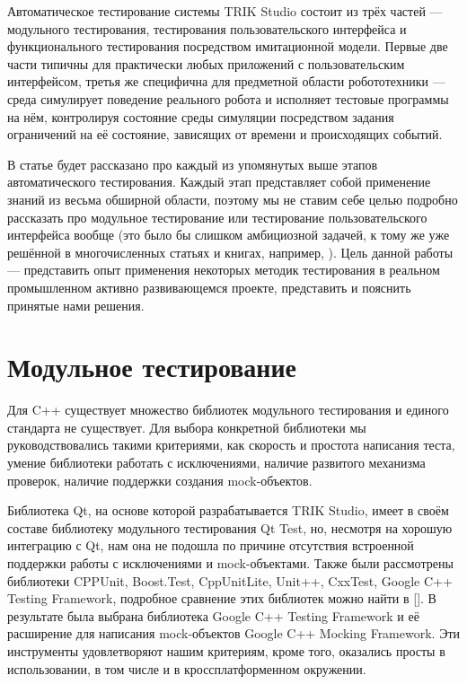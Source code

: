 \documentclass[conference]{IEEEtran}
\begin{document}
Автоматическое тестирование системы TRIK Studio состоит из трёх частей --- модульного тестирования, тестирования 
пользовательского интерфейса и функционального тестирования посредством имитационной модели. Первые две части 
типичны для практически любых приложений с пользовательским интерфейсом, третья же специфична для предметной 
области робототехники --- среда симулирует поведение реального робота и исполняет тестовые программы на нём, 
контролируя состояние среды симуляции посредством задания ограничений на её состояние, зависящих от времени и происходящих событий.

В статье будет рассказано про каждый из упомянутых выше этапов автоматического тестирования. Каждый этап 
представляет собой применение знаний из весьма обширной области, поэтому мы не ставим себе целью подробно 
рассказать про модульное тестирование или тестирование пользовательского интерфейса вообще (это было бы слишком 
амбициозной задачей, к тому же уже решённой в многочисленных статьях и книгах, например, \cite{banerjee2013graphical, kotlyarov2006testing}). 
Цель данной работы --- представить опыт применения некоторых методик тестирования в реальном промышленном 
активно развивающемся проекте, представить и пояснить принятые нами решения.

\section{Модульное тестирование}
Для C++ существует множество библиотек модульного тестирования и единого стандарта 
не существует. Для выбора конкретной библиотеки мы руководствовались такими критериями, 
как скорость и простота написания теста, умение библиотеки работать с исключениями, 
наличие развитого механизма проверок, наличие поддержки создания mock-объектов. 

Библиотека Qt, на основе которой разрабатывается TRIK Studio, имеет в своём составе 
библиотеку модульного тестирования Qt Test, но, несмотря на хорошую интеграцию с Qt, 
нам она не подошла по причине отсутствия встроенной поддержки работы с исключениями 
и mock-объектами. Также были рассмотрены библиотеки CPPUnit, Boost.Test, CppUnitLite, 
Unit++, CxxTest, Google C++ Testing Framework, подробное сравнение этих библиотек можно 
найти в []. В результате была выбрана библиотека Google C++ Testing Framework и её 
расширение для написания mock-объектов Google C++ Mocking Framework. Эти инструменты 
удовлетворяют нашим критериям, кроме того, оказались просты в использовании, в том 
числе и в кроссплатформенном окружении. 
\end{document}
